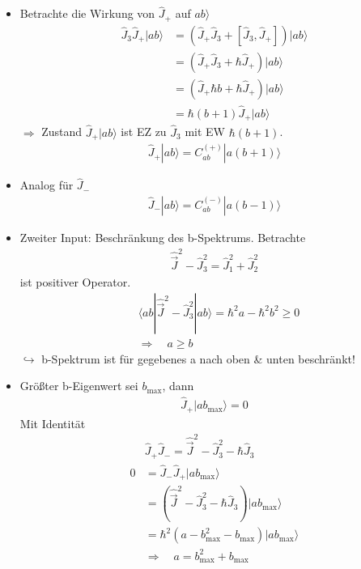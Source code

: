 \documentclass[10pt,article,colorback,accentcolor=tud9d]{scrartcl}
\begin{document}
\begin{itemize}
	\item Betrachte die Wirkung von $\hat{J}_+$ auf $ab\rangle$
    \begin{align}
    \hat{J}_3\hat{J}_+|ab\rangle&=(\hat{J}_+\hat{J}_3+[\hat{J}_3,\hat{J}_+])|ab\rangle\\
    &=(\hat{J}_+\hat{J}_3+\hbar\hat{J}_+)|ab\rangle\\
    &=(\hat{J}_+\hbar b+\hbar\hat{J}_+)|ab\rangle\\
    &=\hbar(b+1)\hat{J}_+|ab\rangle
    \end{align}
    $\Rightarrow$ Zustand $\hat{J}_+|ab\rangle$ ist EZ zu $\hat{J}_3$ mit EW $\hbar(b+1)$.
    \begin{align}
    \hat{J}_+|ab\rangle=C_{ab}^{(+)}|a(b+1)\rangle
    \end{align}
  \item Analog für $\hat{J}_-$
    \begin{align}
    \hat{J}_-|ab\rangle=C_{ab}^{(-)}|a(b-1)\rangle
    \end{align}
  \item Zweiter Input: Beschränkung des b-Spektrums. Betrachte
    \begin{align}
    \hat{\vec{J}}^2-\hat{J}^2_3=\hat{J}^2_1+\hat{J}^2_2
    \end{align}
    ist positiver Operator.
    \begin{align}
    &\langle ab|\hat{\vec{J}}^2-\hat{J}^2_3|ab\rangle=\hbar^2a-\hbar^2b^2\geq0\\
    &\Rightarrow \quad a\geq b
    \end{align}
    $\hookrightarrow$ b-Spektrum ist für gegebenes a nach oben \& unten beschränkt!
  \item Größter b-Eigenwert sei $b_{\text{max}}$, dann
    \begin{align}
    \hat{J}_+|ab_{\text{max}}\rangle=0
    \end{align}
    Mit Identität
    \begin{align}
    &\hat{J}_+\hat{J}_-=\hat{\vec{J}}^2-\hat{J}^2_3-\hbar\hat{J}_3\\
    0&=\hat{J}_-\hat{J}_+|ab_{\text{max}}\rangle\\
    &=(\hat{\vec{J}}^2-\hat{J}_3^2-\hbar\hat{J}_3)|ab_{\text{max}}\rangle\\
    &=\hbar^2(a-b_\text{max}^2-b_\text{max})|ab_\text{max}\rangle\\
    &\Rightarrow \quad a=b_\text{max}^2+b_\text{max}
    \end{align}

\end{itemize}
\end{document}
